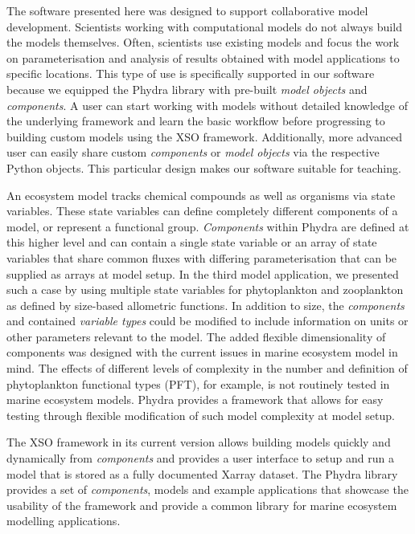 \documentclass[journal abbreviation, manuscript]{copernicus}
\begin{document}
The software presented here was designed to support collaborative model development. Scientists working with computational models do not always build the models themselves. Often, scientists use existing models and focus the work on parameterisation and analysis of results obtained with model applications to specific locations. This type of use is specifically supported in our software because we equipped the Phydra library with pre-built \textit{model objects} and \textit{components}. A user can start working with models without detailed knowledge of the underlying framework and learn the basic workflow before progressing to building custom models using the XSO framework. Additionally, more advanced user can easily share custom \textit{components} or \textit{model objects} via the respective Python objects. This particular design makes our software suitable for teaching.

An ecosystem model tracks chemical compounds as well as organisms via state variables. These state variables can define completely different components of a model, or represent a functional group. \textit{Components} within Phydra are defined at this higher level and can contain a single state variable or an array of state variables that share common fluxes with differing parameterisation that can be supplied as arrays at model setup. In the third model application, we presented such a case by using multiple state variables for phytoplankton and zooplankton as defined by size-based allometric functions. In addition to size, the \textit{components} and contained \textit{variable types} could be modified to include information on units or other parameters relevant to the model. The added flexible dimensionality of components was designed with the current issues in marine ecosystem model in mind. The effects of different levels of complexity in the number and definition of phytoplankton functional types (PFT), for example, is not routinely tested in marine ecosystem models. Phydra provides a framework that allows for easy testing through flexible modification of such model complexity at model setup.

The XSO framework in its current version allows building models quickly and dynamically from \textit{components} and provides a user interface to setup and run a model that is stored as a fully documented Xarray dataset. The Phydra library provides a set of \textit{components}, models and example applications that showcase the usability of the framework and provide a common library for marine ecosystem modelling applications. 
\end{document}
